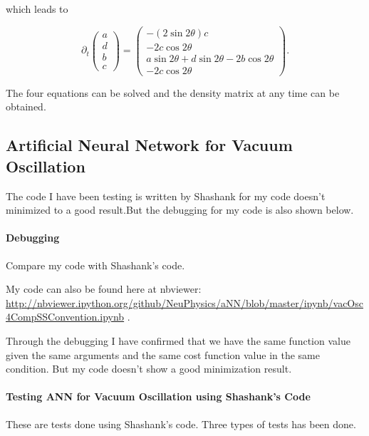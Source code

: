 \documentclass{tufte-handout}
\begin{document}
which leads to

\begin{equation}
\partial_t \begin{pmatrix} a \\ d \\ b \\ c
\end{pmatrix}  = \begin{pmatrix} - (2 \sin 2\theta ) c \\  -2c \cos 2\theta   \\ a\sin 2\theta + d \sin 2\theta - 2b \cos 2\theta \\ -2c\cos 2\theta   \end{pmatrix}.
\end{equation}


The four equations can be solved and the density matrix at any time can be obtained.





\subsection{Artificial Neural Network for Vacuum Oscillation}


The code I have been testing is written by Shashank for my code doesn't minimized to a good result.But the debugging for my code is also shown below.



\paragraph{Debugging} Compare my code with Shashank's code. 

My code can also be found here at nbviewer:
\url{http://nbviewer.ipython.org/github/NeuPhysics/aNN/blob/master/ipynb/vacOsc4CompSSConvention.ipynb} .



Through the debugging I have confirmed that we have the same function value given the same arguments and the same cost function value in the same condition. But my code doesn't show a good minimization result.


\paragraph{Testing ANN for Vacuum Oscillation using Shashank's Code} These are tests done using Shashank's code. Three types of tests has been done.
\end{document}

